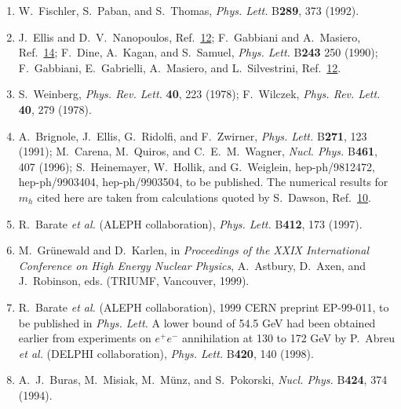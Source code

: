 \begin{enumerate}
  \item {}\label{ch28-ref-23}
  W.~Fischler, S.~Paban, and S.~Thomas, \textit{Phys. Lett.}
  B\textbf{289}, 373 (1992).

  \item {}\label{ch28-ref-24}
  J.~Ellis and D.~V.~Nanopoulos, Ref.~\hyperref[ch28-ref-12]{12};
  F.~Gabbiani and A.~Masiero, Ref.~\hyperref[ch28-ref-14]{14};
  F.~Dine, A.~Kagan, and S.~Samuel, \textit{Phys. Lett.}
  B\textbf{243} 250 (1990); F.~Gabbiani, E.~Gabrielli, A.~Masiero,
  and L.~Silvestrini, Ref.~\hyperref[ch28-ref-12]{12}.

  \item {}\label{ch28-ref-25}
  S.~Weinberg, \textit{Phys. Rev. Lett.} \textbf{40}, 223 (1978);
  F.~Wilczek, \textit{Phys. Rev. Lett.} \textbf{40}, 279 (1978).

  \item {}\label{ch28-ref-26}
  A.~Brignole, J.~Ellis, G.~Ridolfi, and F.~Zwirner,
  \textit{Phys. Lett.} B\textbf{271}, 123 (1991); M.~Carena,
  M.~Quiros, and C.~E.~M.~Wagner, \textit{Nucl. Phys.} B\textbf{461},
  407 (1996); S.~Heinemayer, W.~Hollik, and G.~Weiglein,
  hep-ph/9812472, hep-ph/9903404, hep-ph/9903504, to be published. The
  numerical results for $m_h$ cited here are taken from calculations
  quoted by S.~Dawson, Ref.~\hyperref[ch28-ref-10]{10}.

  \item {}\label{ch28-ref-27}
  R.~Barate \textit{et al.} (ALEPH collaboration),
  \textit{Phys. Lett.} B\textbf{412}, 173 (1997).

  \item[27a.] \label{ch28-ref-27a}
  M.~Gr\"unewald and D.~Karlen, in \textit{Proceedings of the XXIX
  International Conference on High Energy Nuclear Physics},
  A.~Astbury, D.~Axen, and J.~Robinson, eds. (TRIUMF, Vancouver, 1999).

  \item {}\label{ch28-ref-28}
  R.~Barate \textit{et al.} (ALEPH collaboration), 1999 CERN preprint
  EP-99-011, to be published in \textit{Phys. Lett.} A lower bound of
  54.5 GeV had been obtained earlier from experiments on
  $e^+e^-$ annihilation at 130 to 172 GeV by P.~Abreu
  \textit{et al.} (DELPHI collaboration), \textit{Phys. Lett.}
  B\textbf{420}, 140 (1998).

  \item {}\label{ch28-ref-29}
  A.~J.~Buras, M.~Misiak, M.~M\"unz, and S.~Pokorski,
  \textit{Nucl. Phys.} B\textbf{424}, 374 (1994).


\end{enumerate}
